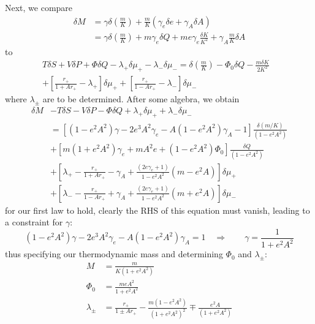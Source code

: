 \documentclass[
twoside,openright,frontopenright]{dmathesis}
\begin{document}
Next, we compare
\begin{equation}
\begin{aligned}
\delta M &= \gamma \delta \left ( \frac{m}{K} \right ) 
+ \frac{m}{K} (\gamma_e \delta e + \gamma_A \delta A)
\\&= \gamma \delta \left ( \frac{m}{K} \right ) 
+ m \gamma_e \delta Q + m e \gamma_e \frac{\delta K}{K^2}
+ \gamma_A \frac{m}{K} \delta A
\end{aligned}
\end{equation}
to
\begin{equation}
\begin{aligned}
T \delta S + V \delta P + \Phi \delta Q -\lambda_+ \delta \mu_+ - \lambda_-\delta \mu_-
= \delta \left ( \frac{m}{K} \right ) 
- \Phi_0 \delta Q - \frac{m\delta K}{2K^2}&\\
+ \left [ \frac{r_+}{1+Ar_+} - \lambda _+ \right]\delta \mu_+
+ \left [ \frac{r_+}{1-Ar_+} - \lambda _- \right]\delta \mu_-&
\end{aligned}
\end{equation}
where $\lambda_\pm$ are to be determined. After some
algebra, we obtain
\begin{equation}
\begin{aligned}
\delta M &- T \delta S - V \delta P - \Phi \delta Q 
+ \lambda_+ \delta \mu_+ + \lambda_-\delta \mu_-\\
&=
\left [ (1-e^2 A^2) \gamma-2 e^3A^2 \gamma_e - A(1-e^2 A^2) \gamma_A -1 \right] 
 \frac{ \delta \left ( {m/K} \right ) }{(1-e^2A^2)}  \\
&+ \left [ m (1+e^2 A^2) \gamma_e + mA^2 e
+(1-e^2 A^2) \Phi_0 \right] \frac{ \delta Q }{(1-e^2A^2) }\\
&+ \left [ \lambda_+ - \frac{r_+}{1+Ar_+} - \gamma_A 
+ \frac{(2e\gamma_e+1)}{1-e^2 A^2} \left ( m - e^2A \right) 
\right] \delta \mu_+\\
&+ \left [ \lambda_- - \frac{r_+}{1-Ar_+} + \gamma_A 
+\frac{(2e\gamma_e+1)}{1-e^2 A^2} \left ( m + e^2A \right) 
\right] \delta \mu_-
\end{aligned}
\end{equation}
for our first law to hold, clearly the RHS of this equation must vanish, leading
to a constraint for $\gamma$:
\begin{equation}
(1-e^2 A^2) \gamma-2 e^3A^2 \gamma_e - A(1-e^2 A^2) \gamma_A =1
\quad \Rightarrow \qquad \gamma = \frac{1}{1+e^2 A^2}
\end{equation}
thus specifying our thermodynamic mass
and determining $\Phi_0$ and $\lambda_\pm$:
\begin{equation}
\begin{aligned}
M &= \frac{m}{K(1+e^2 A^2)} \\
\Phi_0 &= \frac{meA^2}{1+e^2 A^2}\\
\lambda_\pm &= \frac{r_+}{1\pm Ar_+} - \frac{m(1-e^2A^2)}{(1+e^2 A^2)^2} 
\mp \frac{e^2A}{(1+e^2 A^2)}
\end{aligned}
\label{TDparams}
\end{equation}
\end{document}

